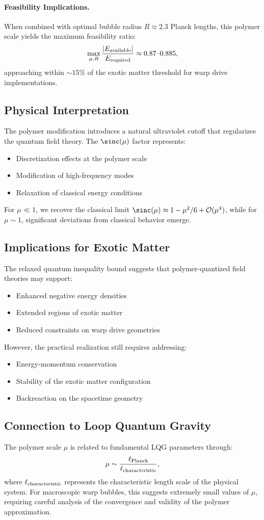 \documentclass[11pt]{article}
\begin{document}
\paragraph{Feasibility Implications.}
When combined with optimal bubble radius $R \approx 2.3$ Planck lengths, this polymer scale yields the maximum feasibility ratio:
\[
  \max_{\mu,R}\frac{|E_{\rm available}|}{E_{\rm required}} \approx 0.87\text{--}0.885,
\]
approaching within $\sim15\%$ of the exotic matter threshold for warp drive implementations.

\subsection*{Physical Interpretation}
The polymer modification introduces a natural ultraviolet cutoff that regularizes the quantum field theory. The $\sinc(\mu)$ factor represents:
\begin{itemize}
  \item Discretization effects at the polymer scale
  \item Modification of high-frequency modes
  \item Relaxation of classical energy conditions
\end{itemize}

For $\mu \ll 1$, we recover the classical limit $\sinc(\mu) \approx 1 - \mu^2/6 + \mathcal{O}(\mu^4)$, while for $\mu \sim 1$, significant deviations from classical behavior emerge.

\subsection*{Implications for Exotic Matter}
The relaxed quantum inequality bound suggests that polymer-quantized field theories may support:
\begin{itemize}
  \item Enhanced negative energy densities
  \item Extended regions of exotic matter
  \item Reduced constraints on warp drive geometries
\end{itemize}

However, the practical realization still requires addressing:
\begin{itemize}
  \item Energy-momentum conservation
  \item Stability of the exotic matter configuration
  \item Backreaction on the spacetime geometry
\end{itemize}

\subsection*{Connection to Loop Quantum Gravity}
The polymer scale $\mu$ is related to fundamental LQG parameters through:
\[
  \mu \sim \frac{\ell_{\rm Planck}}{\ell_{\rm characteristic}},
\]
where $\ell_{\rm characteristic}$ represents the characteristic length scale of the physical system. For macroscopic warp bubbles, this suggests extremely small values of $\mu$, requiring careful analysis of the convergence and validity of the polymer approximation.
\end{document}
